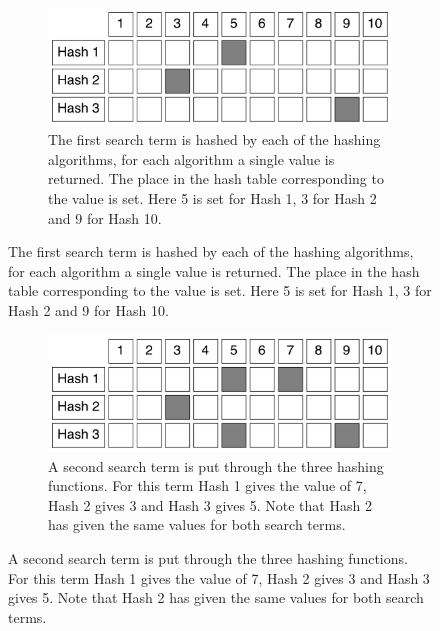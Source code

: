 \documentclass{article}
\begin{document}
\begin{figure}[h!bt]
  \ContinuedFloat  
  \label{bloom-2}
  \centering
  \begin{subfigure}{\textwidth}
  \makeatletter
  \includegraphics[width=\textwidth]{images/bloom-2}
  \caption{The first search term is hashed by each of the hashing algorithms, for each algorithm a single value is returned. The place in the hash table corresponding to the value is set. Here 5 is set for Hash 1, 3 for Hash 2 and 9 for Hash 10.}
  \end{subfigure}
\end{figure}

\begin{figure}[h!bt]
  \ContinuedFloat  
  \label{bloom-3}
  \centering
  \begin{subfigure}{\textwidth}
  \makeatletter
  \includegraphics[width=\textwidth]{images/bloom-3}
  \caption{A second search term is put through the three hashing functions. For this term Hash 1 gives the value of 7, Hash 2 gives 3 and Hash 3 gives 5. Note that Hash 2 has given the same values for both search terms.}
  \end{subfigure}
\end{figure}
\end{document}
